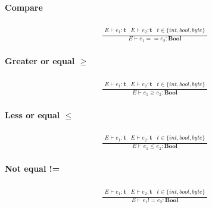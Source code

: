 \documentclass[paper=a4, fontsize=11pt]{article}
\numberwithin{equation}{section}	%
\numberwithin{figure}{section}		%
\numberwithin{table}{section}		%
\begin{document}
            \paragraph*{Compare}
            \begin{align*}
                \frac{
                \begin{array}{lll}
                E \vdash e_1 : \textbf{t} & E \vdash e_2 : \textbf{t} & t \in \{ int, bool, byte \}
                \end{array} }{E \vdash e_1==e_2 : \textbf{Bool}}
            \end{align*}
                
            \paragraph*{Greater or equal $\geq$}
            \begin{align*}
                \frac{
                \begin{array}{lll}
                E \vdash e_1 : \textbf{t} & E \vdash e_2 : \textbf{t} & t \in \{ int, bool, byte \}
                \end{array} }{E \vdash e_1 \geq e_2 : \textbf{Bool}}
            \end{align*}

            \paragraph*{Less or equal $\leq$}
            \begin{align*}
                \frac{
                \begin{array}{lll}
                E \vdash e_1 : \textbf{t} & E \vdash e_2 : \textbf{t} & t \in \{ int, bool, byte \}
                \end{array} }{E \vdash e_1 \leq e_2 : \textbf{Bool}}
            \end{align*}
                
            \paragraph*{Not equal !=}
            \begin{align*}
                \frac{
                \begin{array}{lll}
                E \vdash e_1 : \textbf{t} & E \vdash e_2 : \textbf{t} & t \in \{ int, bool, byte \}
                \end{array} }{E \vdash e_1 != e_2 : \textbf{Bool}}
            \end{align*}
\end{document}
